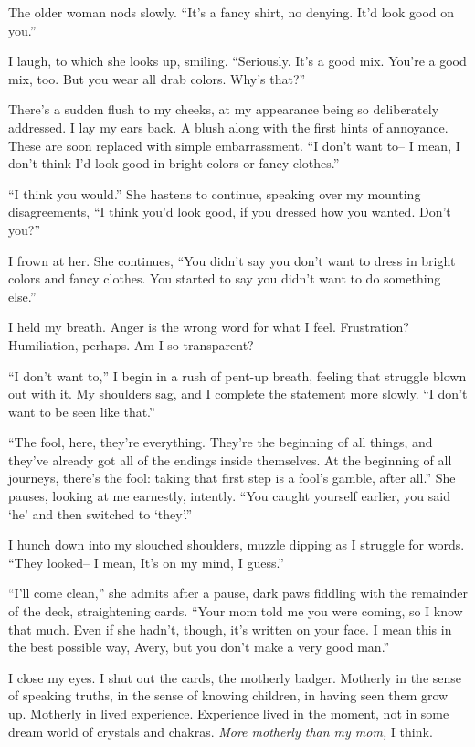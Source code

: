 The older woman nods slowly. ``It's a fancy shirt, no denying. It'd look
good on you.''

I laugh, to which she looks up, smiling. ``Seriously. It's a good mix.
You're a good mix, too. But you wear all drab colors. Why's that?''

There's a sudden flush to my cheeks, at my appearance being so
deliberately addressed. I lay my ears back. A blush along with the first
hints of annoyance. These are soon replaced with simple embarrassment.
``I don't want to-- I mean, I don't think I'd look good in bright colors
or fancy clothes.''

``I think you would.'' She hastens to continue, speaking over my
mounting disagreements, ``I think you'd look good, if you dressed how
you wanted. Don't you?''

I frown at her. She continues, ``You didn't say you don't want to dress
in bright colors and fancy clothes. You started to say you didn't want
to do something else.''

I held my breath. Anger is the wrong word for what I feel. Frustration?
Humiliation, perhaps. Am I so transparent?

``I don't want to,'' I begin in a rush of pent-up breath, feeling that
struggle blown out with it. My shoulders sag, and I complete the
statement more slowly. ``I don't want to be seen like that.''

``The fool, here, they're everything. They're the beginning of all
things, and they've already got all of the endings inside themselves. At
the beginning of all journeys, there's the fool: taking that first step
is a fool's gamble, after all.'' She pauses, looking at me earnestly,
intently. ``You caught yourself earlier, you said `he' and then switched
to `they'.''

I hunch down into my slouched shoulders, muzzle dipping as I struggle
for words. ``They looked-- I mean, It's on my mind, I guess.''

``I'll come clean,'' she admits after a pause, dark paws fiddling with
the remainder of the deck, straightening cards. ``Your mom told me you
were coming, so I know that much. Even if she hadn't, though, it's
written on your face. I mean this in the best possible way, Avery, but
you don't make a very good man.''

I close my eyes. I shut out the cards, the motherly badger. Motherly in
the sense of speaking truths, in the sense of knowing children, in
having seen them grow up. Motherly in lived experience. Experience lived
in the moment, not in some dream world of crystals and chakras.
\emph{More motherly than my mom,} I think.

